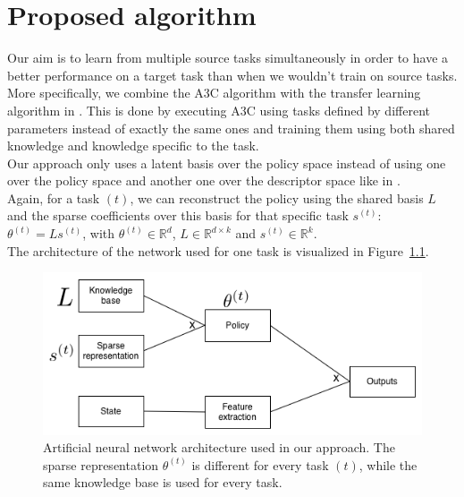 \chapter{Proposed algorithm}
\label{cha:proposed_algorithm} %
Our aim is to learn from multiple source tasks simultaneously in order to have a better performance on a target task than when we wouldn't train on source tasks.
More specifically, we combine the A3C algorithm \parencite{Mnih2016AsynchronousLearning} with the transfer learning algorithm in \cite{Isele2016UsingLearning}.
This is done by executing A3C using tasks defined by different parameters instead of exactly the same ones and training them using both shared knowledge and knowledge specific to the task.\\

Our approach only uses a latent basis over the policy space instead of using one over the policy space and another one over the descriptor space like in \cite{Isele2016UsingLearning}.\\
Again, for a task $(t)$, we can reconstruct the policy using the shared basis $L$ and the sparse coefficients over this basis for that specific task $s^{(t)}$: $\theta^{(t)} = Ls^{(t)}$, with $\theta^{(t)} \in \mathbb{R}^d$, $L \in \mathbb{R}^{d \times k}$ and $s^{(t)} \in \mathbb{R}^k$.\\
The architecture of the network used for one task is visualized in Figure~\ref{fig:algonn}.\\
\begin{figure}[htb]
    \centering
    \includegraphics[width=\linewidth]{images/knowledge_transfer.png}
    \caption[Artificial neural network architecture used in our approach]{Artificial neural network architecture used in our approach. The sparse representation $\theta^{(t)}$ is different for every task $(t)$, while the same knowledge base is used for every task.}
    \label{fig:algonn}
\end{figure}

